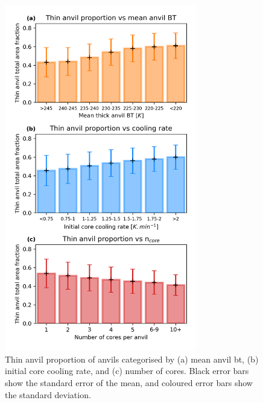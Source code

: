 \begin{figure}[tp]
    \centering
    \includegraphics[width=0.75\textwidth]{figures/chapter3_04.png}
    \caption[
    Thin anvil proportion of anvils categorised by mean anvil \acrshort{bt}, initial core cooling rate and number of cores
    ]{
    Thin anvil proportion of anvils categorised by (a) mean anvil \acrshort{bt}, (b) initial core cooling rate, and (c) number of cores. Black error bars show the standard error of the mean, and coloured error bars show the standard deviation.
    }
    \label{fig:thin_anvil_proportion}
\end{figure}

